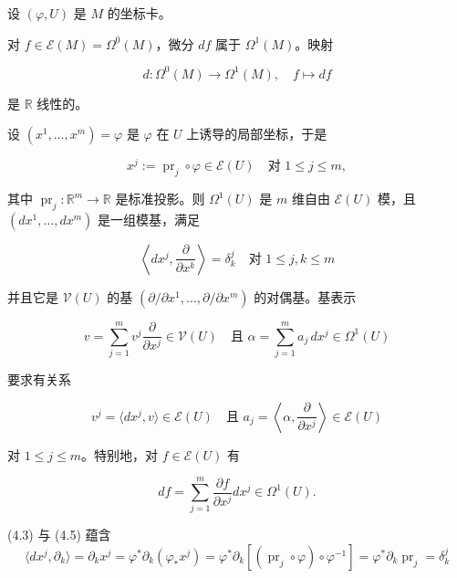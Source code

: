 \begin{remark}

设 $ (\varphi,U) $ 是 $ M $ 的坐标卡。

\begin{items}
\item

对 $ f\in\mathcal{E}(M) = \Omega^{0}(M) $，微分 $ df $ 属于 $ \Omega^{1}(M) $。映射

\[
d : \Omega^{0}(M)\to\Omega^{1}(M), \quad f\mapsto df
\]

是 $ \mathbb{R} $ 线性的。

\item

设 $ (x^{1},\ldots,x^{m}) = \varphi $ 是 $ \varphi $ 在 $ U $ 上诱导的局部坐标，于是

\[
x^{j} := \operatorname{pr}_{j}\circ\varphi\in\mathcal{E}(U) \quad \text{对 } 1\le j\le m,
\]

其中 $ \operatorname{pr}_{j} : \mathbb{R}^{m}\to\mathbb{R} $ 是标准投影。则 $ \Omega^{1}(U) $ 是 $ m $ 维自由 $ \mathcal{E}(U) $ 模，且 $ (dx^{1},\ldots,dx^{m}) $ 是一组模基，满足

\begin{equation}
\left\langle dx^{j},\frac{\partial}{\partial x^{k}}\right\rangle = \delta_{k}^{j} \quad \text{对 } 1\le j,k\le m\tag{4.6}
\end{equation}

并且它是 $ \mathcal{V}(U) $ 的基 $ (\partial/\partial x^{1},\ldots,\partial/\partial x^{m}) $ 的对偶基。基表示

\begin{equation}
v = \sum_{j=1}^{m}v^{j}\frac{\partial}{\partial x^{j}}\in\mathcal{V}(U) \quad \text{且 } \alpha = \sum_{j=1}^{m}a_{j}\,dx^{j}\in\Omega^{1}(U)\tag{4.7}
\end{equation}

要求有关系

\begin{equation}
v^{j} = \langle dx^{j},v\rangle\in\mathcal{E}(U) \quad \text{且 } a_{j} = \left\langle\alpha,\frac{\partial}{\partial x^{j}}\right\rangle\in\mathcal{E}(U)\tag{4.8}
\end{equation}

对 $ 1\le j\le m $。特别地，对 $ f\in\mathcal{E}(U) $ 有

\[
df = \sum_{j=1}^{m}\frac{\partial f}{\partial x^{j}}dx^{j}\in\Omega^{1}(U).
\]

\proofhead
(4.3) 与 (4.5) 蕴含
\[
\langle dx^{j},\partial_{k}\rangle = \partial_{k}x^{j} = \varphi^{\ast}\partial_{k}(\varphi_{\ast}x^{j}) = \varphi^{\ast}\partial_{k}[(\operatorname{pr}_{j}\circ\varphi)\circ\varphi^{-1}] = \varphi^{\ast}\partial_{k}\operatorname{pr}_{j} = \delta_{k}^{j}
\]


\end{items}
\end{remark}
